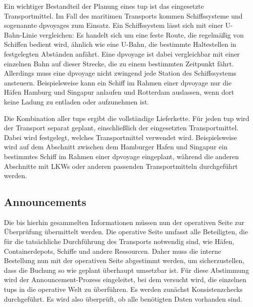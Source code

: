 Ein wichtiger Bestandteil der Planung eines \gls{tup} ist das eingesetzte Transportmittel. Im Fall des maritimen Transports kommen Schiffssysteme und sogenannte \glspl{dpvoyage} zum Einsatz. Ein Schiffssystem lässt sich mit einer U-Bahn-Linie vergleichen: Es handelt sich um eine feste Route, die regelmäßig von Schiffen bedient wird, ähnlich wie eine U-Bahn, die bestimmte Haltestellen in festgelegten Abständen anfährt. Eine \gls{dpvoyage} ist dabei vergleichbar mit einer einzelnen Bahn auf dieser Strecke, die zu einem bestimmten Zeitpunkt fährt. Allerdings muss eine \gls{dpvoyage} nicht zwingend jede Station des Schiffssystems ansteuern. Beispielsweise kann ein Schiff im Rahmen einer \gls{dpvoyage} nur die Häfen Hamburg und Singapur anlaufen und Rotterdam auslassen, wenn dort keine Ladung zu entladen oder aufzunehmen ist.

Die Kombination aller \glspl{tup} ergibt die vollständige Lieferkette. Für jeden \gls{tup} wird der Transport separat geplant, einschließlich der eingesetzten Transportmittel. Dabei wird festgelegt, welches Transportmittel verwendet wird.
Beispielsweise wird auf dem Abschnitt zwischen dem Hamburger Hafen und Singapur ein bestimmtes Schiff im Rahmen einer \gls{dpvoyage} eingeplant, während die anderen Abschnitte mit LKWs oder anderen passenden Transportmitteln durchgeführt werden.

\subsection{Announcements}
\label{ref:announcement}

%

Die bis hierhin gesammelten Informationen müssen nun der operativen Seite zur Überprüfung übermittelt werden.
Die operative Seite umfasst alle Beteiligten, die für die tatsächliche Durchführung des Transports notwendig sind, wie Häfen, Containerdepots, Schiffe und andere Ressourcen. Daher muss die interne Bestellung nun mit der operativen Seite abgestimmt werden, um sicherzustellen, dass die Buchung so wie geplant überhaupt umsetzbar ist. Für diese Abstimmung wird der Announcement-Prozess eingeleitet, bei dem versucht wird, die einzelnen \glspl{tup} in die operative Welt zu überführen. Es werden zunächst Konsistenzchecks durchgeführt. Es wird also überprüft, ob alle benötigten Daten vorhanden sind. 

